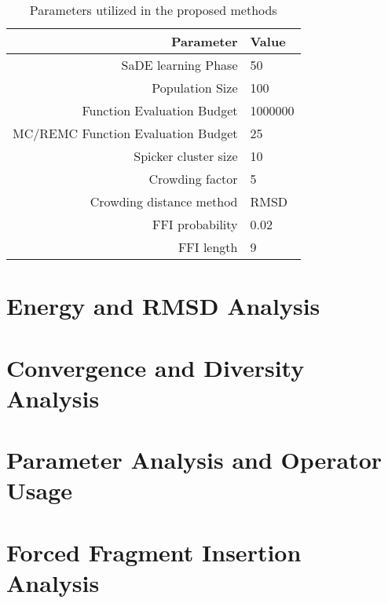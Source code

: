 \begin{table}[ht]
    \centering
    \begin{tabular}{r|l} \hline \hline
        Parameter & Value \\ \hline \hline
        SaDE learning Phase & 50 \\ \hline
        Population Size & 100 \\ \hline
        Function Evaluation Budget & 1000000 \\ \hline
        MC/REMC Function Evaluation Budget & 25 \\ \hline
        Spicker cluster size & 10 \\ \hline
        Crowding factor & 5 \\ \hline
        Crowding distance method & RMSD \\ \hline
        \ac{FFI} probability & 0.02 \\ \hline
        \ac{FFI} length & 9 \\ \hline \hline
    \end{tabular}
    \caption{Parameters utilized in the proposed methods}
    \label{tab:parameters}
\end{table}

\section{Energy and \ac{RMSD} Analysis}\label{sec:methods-analysis}







\section{Convergence and Diversity Analysis}

\section{Parameter Analysis and Operator Usage}

\section{Forced Fragment Insertion Analysis}

